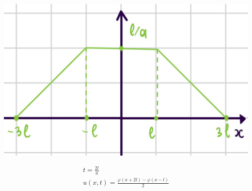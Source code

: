     \begin{minipage}{0.4\textwidth}
  \includegraphics[width=1\linewidth]{pictures/u9.jpg} 
    \end{minipage}
    \begin{minipage}{0.4\textwidth}\raggedleft
      \begin{gather*}
        t = \frac{2l}{a} \\
        u(x,t) = \frac{\varphi(x+ 2l)- \varphi(x -l)}{2} \\
      \end{gather*}
    \end{minipage} \\
